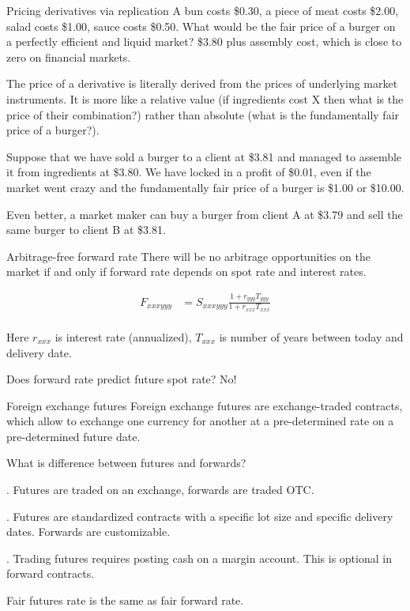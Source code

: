 \documentclass{beamer}
\begin{document}
\begin{frame}{Pricing derivatives via replication}
\justify
A bun costs \$0.30, a piece of meat costs \$2.00, salad costs \$1.00, sauce costs \$0.50. What would be the fair price of a burger on a perfectly efficient and liquid market? \$3.80 plus assembly cost, which is close to zero on financial markets.

\justify
The price of a derivative is literally derived from the prices of underlying market instruments. It is more like a relative value (if ingredients cost X then what is the price of their combination?) rather than absolute (what is the fundamentally fair price of a burger?).

\justify
Suppose that we have sold a burger to a client at \$3.81 and managed to assemble it from ingredients at \$3.80. We have locked in a profit of \$0.01, even if the market went crazy and the fundamentally fair price of a burger is \$1.00 or \$10.00.

\justify
Even better, a market maker can buy a burger from client A at \$3.79 and sell the same burger to client B at \$3.81.
\end{frame}



\begin{frame}{Arbitrage-free forward rate}
\justify
There will be no arbitrage opportunities on the market if and only if forward rate depends on spot rate and interest rates.

\begin{align*}
F_{xxxyyy} &= S_{xxxyyy} \frac{1 + r_{yyy}T_{yyy}}{1 + r_{xxx}T_{xxx}} \\
\end{align*}

Here $r_{xxx}$ is interest rate (annualized), $T_{xxx}$ is number of years between today and delivery date.

\justify
Does forward rate predict future spot rate? No!
\end{frame}



\begin{frame}{Foreign exchange futures}
\justify
\alert{Foreign exchange futures} are exchange-traded contracts, which allow to exchange one currency for another at a pre-determined rate on a pre-determined future date.

\justify
What is difference between futures and forwards?

. Futures are traded on an exchange, forwards are traded OTC.

. Futures are standardized contracts with a specific lot size and specific delivery dates. Forwards are customizable.

. Trading futures requires posting cash on a margin account. This is optional in forward contracts.

\justify
Fair futures rate is the same as fair forward rate.
\end{frame}
\end{document}
